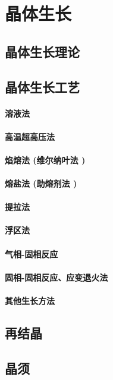 \documentclass[UTF8]{../NatureUniverse}
\begin{document}
\chapter{晶体生长}
\section{晶体生长理论}
\section{晶体生长工艺}
    \subsubsection{溶液法}
    \subsubsection{高温超高压法}
    \subsubsection{焰熔法 (维尔纳叶法 )}
    \subsubsection{熔盐法 (助熔剂法 )}
    \subsubsection{提拉法}
    \subsubsection{浮区法}
    \subsubsection{气相-固相反应}
    \subsubsection{固相-固相反应、应变退火法}
    \subsubsection{其他生长方法}
\section{再结晶}
\section{晶须}
\end{document}
